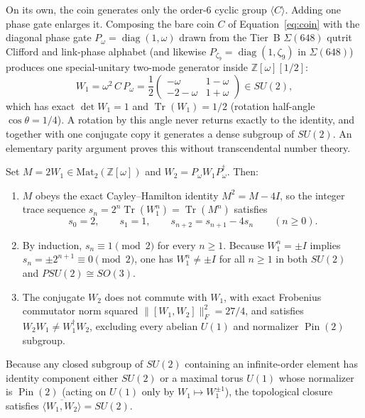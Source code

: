 On its own, the coin generates only the order-6 cyclic group $\langle C \rangle$. Adding one phase gate enlarges it.
Composing the bare coin $C$ of
Equation~\eqref{eq:coin} with the diagonal phase gate $P_\omega = \operatorname{diag}(1, \omega)$ drawn from the
Tier~B $\Sigma(648)$ qutrit Clifford and link-phase alphabet (and likewise $P_{\zeta_9} = \operatorname{diag}(1, \zeta_9)$
in $\Sigma(648)$) produces one special-unitary two-mode generator inside $\mathbb{Z}[\omega][1/2]$:
\begin{equation}
W_1 = \omega^2\, C\, P_\omega
  = \frac{1}{2}\begin{pmatrix} -\omega & 1 - \omega \\ -2 - \omega & 1 + \omega \end{pmatrix} \in SU(2),
\label{eq:su2-gen}
\end{equation}
which has exact $\det W_1 = 1$ and $\operatorname{Tr}(W_1) = 1/2$ (rotation half-angle $\cos\theta = 1/4$). A
rotation by this angle never returns exactly to the identity, and together with one conjugate copy it generates a dense
subgroup of $SU(2)$. An elementary parity argument proves this without transcendental number theory.

\begin{theorem}
Set $M = 2 W_1 \in \mathrm{Mat}_2(\mathbb{Z}[\omega])$ and $W_2 = P_\omega W_1 P_\omega^\dagger$. Then:
\begin{enumerate}
\item $M$ obeys the exact Cayley--Hamilton identity $M^2 = M - 4I$, so the integer trace sequence
$s_n = 2^n \operatorname{Tr}(W_1^n) = \operatorname{Tr}(M^n)$ satisfies
\[
s_0 = 2, \qquad s_1 = 1, \qquad s_{n+2} = s_{n+1} - 4 s_n \qquad (n \ge 0).
\]
\item By induction, $s_n \equiv 1 \pmod 2$ for every $n \ge 1$. Because $W_1^n = \pm I$ implies
$s_n = \pm 2^{n+1} \equiv 0 \pmod 2$, one has $W_1^n \neq \pm I$ for all $n \ge 1$ in both $SU(2)$ and
$PSU(2) \cong SO(3)$.
\item The conjugate $W_2$ does not commute with $W_1$, with exact Frobenius commutator norm squared
$\|[W_1, W_2]\|_F^2 = 27/4$, and satisfies $W_2 W_1 \neq W_1^\dagger W_2$, excluding every abelian $U(1)$ and
normalizer $\operatorname{Pin}(2)$ subgroup.
\end{enumerate}
Because any closed subgroup of $SU(2)$ containing an infinite-order element has identity component either $SU(2)$ or a
maximal torus $U(1)$ whose normalizer is $\operatorname{Pin}(2)$ (acting on $U(1)$ only by $W_1 \mapsto W_1^{\pm 1}$),
the topological closure satisfies $\overline{\langle W_1, W_2 \rangle} = SU(2)$.
\end{theorem}

